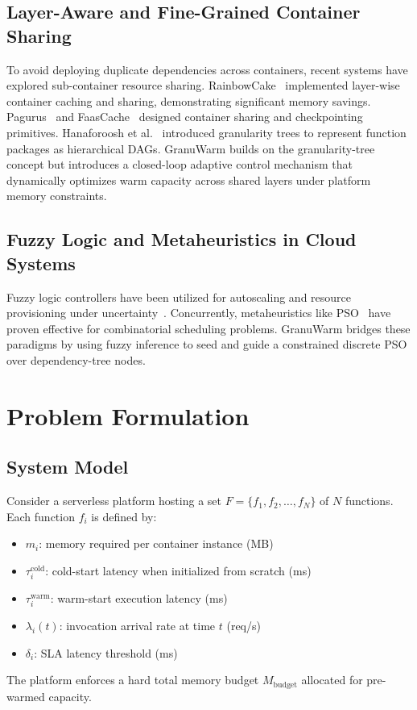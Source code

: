 \documentclass[final,5p,times,twocolumn]{elsarticle}
\begin{document}
\subsection{Layer-Aware and Fine-Grained Container Sharing}

To avoid deploying duplicate dependencies across containers, recent systems have explored sub-container resource sharing. RainbowCake~\cite{rainbowcake2024} implemented layer-wise container caching and sharing, demonstrating significant memory savings. Pagurus~\cite{pagurus2022} and FaasCache~\cite{faascache2021} designed container sharing and checkpointing primitives. Hanaforoosh et al.~\cite{hanaforoosh2025granularity} introduced granularity trees to represent function packages as hierarchical DAGs. GranuWarm builds on the granularity-tree concept but introduces a closed-loop adaptive control mechanism that dynamically optimizes warm capacity across shared layers under platform memory constraints.

\subsection{Fuzzy Logic and Metaheuristics in Cloud Systems}

Fuzzy logic controllers have been utilized for autoscaling and resource provisioning under uncertainty~\cite{jamshidi2014autonomic, mamdani1975experiment}. Concurrently, metaheuristics like PSO~\cite{kennedy1995pso, buyya2023pso} have proven effective for combinatorial scheduling problems. GranuWarm bridges these paradigms by using fuzzy inference to seed and guide a constrained discrete PSO over dependency-tree nodes.

\section{Problem Formulation}

\subsection{System Model}

Consider a serverless platform hosting a set $F = \{f_1, f_2, \ldots, f_N\}$ of $N$ functions. Each function $f_i$ is defined by:
\begin{itemize}
    \item $m_i$: memory required per container instance (MB)
    \item $\tau_i^{\text{cold}}$: cold-start latency when initialized from scratch (ms)
    \item $\tau_i^{\text{warm}}$: warm-start execution latency (ms)
    \item $\lambda_i(t)$: invocation arrival rate at time $t$ (req/s)
    \item $\delta_i$: SLA latency threshold (ms)
\end{itemize}
The platform enforces a hard total memory budget $M_{\text{budget}}$ allocated for pre-warmed capacity.
\end{document}
